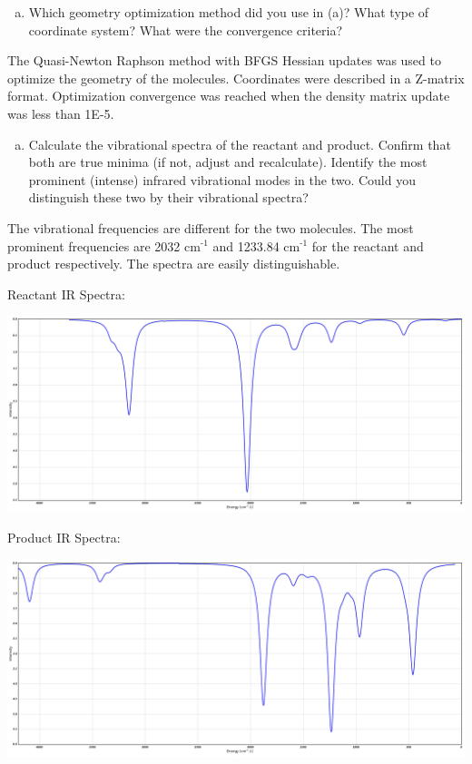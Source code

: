 \documentclass[11pt]{article}
\begin{document}
\begin{enumerate}[(b)]
\item Which geometry optimization method did you use in (a)? What type of coordinate system? What were the convergence criteria?
\end{enumerate}
\linebreak
The Quasi-Newton Raphson method with BFGS Hessian updates was used to optimize the geometry of the molecules. Coordinates were described in a Z-matrix format. Optimization convergence was reached when the density matrix update was less than 1E-5.   

\begin{enumerate}[(c)]
\item Calculate the vibrational spectra of the reactant and product. Confirm that both are true minima (if not, adjust and recalculate). Identify the most prominent (intense) infrared vibrational modes in the two. Could you distinguish these two by their vibrational spectra?
\end{enumerate}
\linebreak

The vibrational frequencies are different for the two molecules. The most prominent frequencies are 2032 cm\(^{\text{-1}}\) and 1233.84 cm\(^{\text{-1}}\) for the reactant and product respectively. The spectra are easily distinguishable. 

Reactant IR Spectra:

\begin{center}
\includegraphics[width=.9\linewidth]{./plotreact.png}
\end{center}

Product IR Spectra:

\begin{center}
\includegraphics[width=.9\linewidth]{./plotprod.png}
\end{center}
\end{document}
